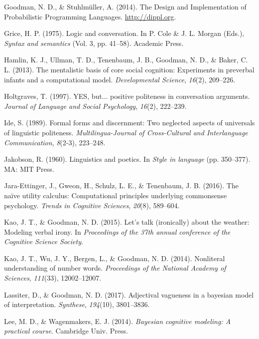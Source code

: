 \documentclass[floatsintext,man]{apa6}
\theoremstyle{definition}
\theoremstyle{definition}
\theoremstyle{definition}
\theoremstyle{remark}
\begin{document}
\hypertarget{ref-dippl}{}
Goodman, N. D., \& Stuhlmüller, A. (2014). The Design and Implementation
of Probabilistic Programming Languages. \url{http://dippl.org}.

\hypertarget{ref-grice1975}{}
Grice, H. P. (1975). Logic and conversation. In P. Cole \& J. L. Morgan
(Eds.), \emph{Syntax and semantics} (Vol. 3, pp. 41--58). Academic
Press.

\hypertarget{ref-hamlin2013mentalistic}{}
Hamlin, K. J., Ullman, T. D., Tenenbaum, J. B., Goodman, N. D., \&
Baker, C. L. (2013). The mentalistic basis of core social cognition:
Experiments in preverbal infants and a computational model.
\emph{Developmental Science}, \emph{16}(2), 209--226.

\hypertarget{ref-holtgraves1997}{}
Holtgraves, T. (1997). YES, but... positive politeness in conversation
arguments. \emph{Journal of Language and Social Psychology},
\emph{16}(2), 222--239.

\hypertarget{ref-ide1989}{}
Ide, S. (1989). Formal forms and discernment: Two neglected aspects of
universals of linguistic politeness. \emph{Multilingua-Journal of
Cross-Cultural and Interlanguage Communication}, \emph{8}(2-3),
223--248.

\hypertarget{ref-jakobson1960}{}
Jakobson, R. (1960). Linguistics and poetics. In \emph{Style in
language} (pp. 350--377). MA: MIT Press.

\hypertarget{ref-jara2016naive}{}
Jara-Ettinger, J., Gweon, H., Schulz, L. E., \& Tenenbaum, J. B. (2016).
The naïve utility calculus: Computational principles underlying
commonsense psychology. \emph{Trends in Cognitive Sciences},
\emph{20}(8), 589--604.

\hypertarget{ref-kao2015}{}
Kao, J. T., \& Goodman, N. D. (2015). Let's talk (ironically) about the
weather: Modeling verbal irony. In \emph{Proceedings of the 37th annual
conference of the Cognitive Science Society}.

\hypertarget{ref-kao2014}{}
Kao, J. T., Wu, J. Y., Bergen, L., \& Goodman, N. D. (2014). Nonliteral
understanding of number words. \emph{Proceedings of the National Academy
of Sciences}, \emph{111}(33), 12002--12007.

\hypertarget{ref-lassiter2017adjectival}{}
Lassiter, D., \& Goodman, N. D. (2017). Adjectival vagueness in a
bayesian model of interpretation. \emph{Synthese}, \emph{194}(10),
3801--3836.

\hypertarget{ref-lee2014}{}
Lee, M. D., \& Wagenmakers, E. J. (2014). \emph{Bayesian cognitive
modeling: A practical course}. Cambridge Univ. Press.
\end{document}
